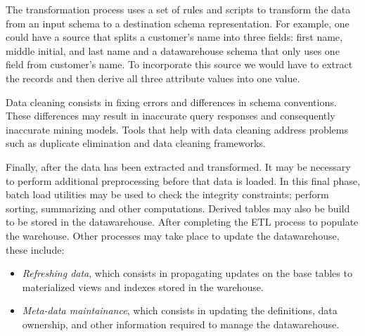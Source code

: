 \documentclass[]{article}
\begin{document}
The transformation process uses a set of rules and scripts to transform the data from an input schema to a destination schema
representation. For example, one could have a source that splits a customer's name into three fields: first name, middle
initial, and last name and a datawarehouse schema that only uses one field from customer's name. To incorporate this source
we would have to extract the records and then derive all three attribute values into one value.

Data cleaning consists in fixing errors and differences in schema conventions. These differences may result in inaccurate
query responses and consequently inaccurate mining models. Tools that help with data cleaning address problems such as
duplicate elimination and data cleaning frameworks.

Finally, after the data has been extracted and transformed. It may be necessary to perform additional preprocessing before
that data is loaded. In this final phase, batch load utilities may be used to check the integrity constraints; perform
sorting, summarizing and other computations. Derived tables may also be build to be stored in the datawarehouse. After
completing the ETL process to populate the warehouse. Other processes may take place to update the datawarehouse, these
include: \begin{itemize} \item \emph{Refreshing data}, which consists in propagating updates on the base tables to
materialized views and indexes stored in the warehouse. \item \emph{Meta-data maintainance}, which consists in updating the
definitions, data ownership, and other information required to manage the datawarehouse. \end{itemize}




\end{document}
